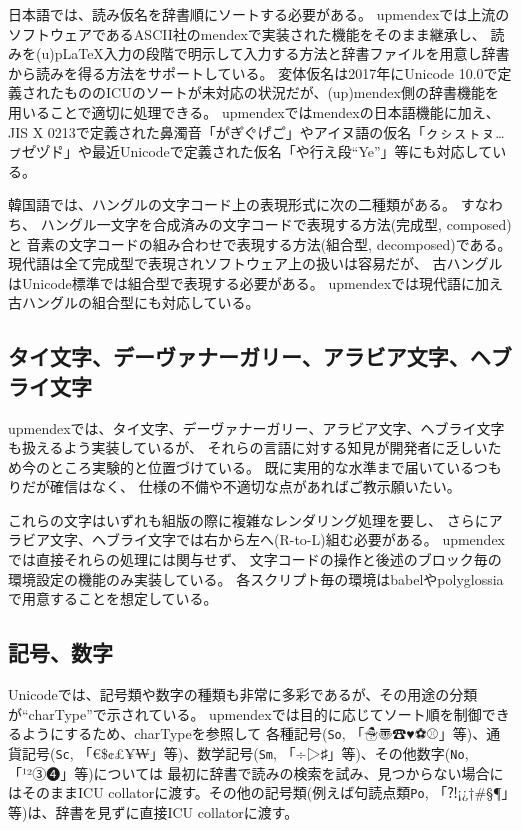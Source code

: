 \documentclass[a4paper]{article}
\begin{document}
日本語では、読み仮名を辞書順にソートする必要がある。
upmendexでは上流のソフトウェアであるASCII社のmendexで実装された機能をそのまま継承し、
読みを(u)pLaTeX入力の段階で明示して入力する方法と辞書ファイルを用意し辞書から読みを得る方法をサポートしている。
変体仮名は2017年にUnicode 10.0で定義されたもののICUのソートが未対応の状況だが、(up)mendex側の辞書機能を用いることで適切に処理できる。
upmendexではmendexの日本語機能に加え、JIS X 0213で定義された鼻濁音「か゚き゚く゚け゚こ゚」やアイヌ語の仮名「ㇰㇱㇲㇳㇴ…ㇷ゚セ゚ツ゚ト゚」や最近Unicodeで定義された仮名「や行え段``Ye''」等にも対応している。

\def\textkorean#1{\relax}
韓国語では、ハングルの文字コード上の表現形式に次の二種類がある。
すなわち、
ハングル一文字を合成済みの文字コードで表現する方法(完成型, {\textkorean{완성형,}} composed)と
音素の文字コードの組み合わせで表現する方法(組合型, {\textkorean{조합형,}} decomposed)である。
現代語は全て完成型で表現されソフトウェア上の扱いは容易だが、
古ハングルはUnicode標準では組合型で表現する必要がある。
upmendexでは現代語に加え古ハングルの組合型にも対応している。

\subsection*{タイ文字、デーヴァナーガリー、アラビア文字、ヘブライ文字}
upmendexでは、タイ文字、デーヴァナーガリー、アラビア文字、ヘブライ文字も扱えるよう実装しているが、
それらの言語に対する知見が開発者に乏しいため今のところ実験的と位置づけている。
既に実用的な水準まで届いているつもりだが確信はなく、
仕様の不備や不適切な点があればご教示願いたい。

これらの文字はいずれも組版の際に複雑なレンダリング処理を要し、
さらにアラビア文字、ヘブライ文字では右から左へ(R-to-L)組む必要がある。
upmendexでは直接それらの処理には関与せず、
文字コードの操作と後述のブロック毎の環境設定の機能のみ実装している。
各スクリプト毎の環境はbabelやpolyglossiaで用意することを想定している。

\subsection*{記号、数字}
Unicodeでは、記号類や数字の種類も非常に多彩であるが、その用途の分類が``charType''で示されている。
upmendexでは目的に応じてソート順を制御できるようにするため、charTypeを参照して
各種記号(\texttt{So}, 「☃〠☎♥⚽⚾」等)、通貨記号(\texttt{Sc}, 「€\$¢£¥₩」等)、数学記号(\texttt{Sm}, 「÷▷♯」等)、その他数字(\texttt{No}, 「¹²③❹」等)については
最初に辞書で読みの検索を試み、見つからない場合にはそのままICU collatorに渡す。その他の記号類(例えば句読点類\texttt{Po}, 「⁈¡¿†\#§¶」等)は、辞書を見ずに直接ICU collatorに渡す。
\end{document}
